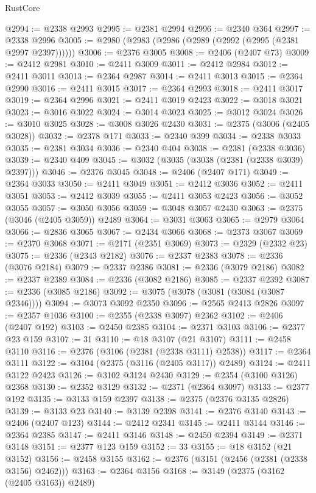 \begin{lexlean}{RustCore}
\begin{coremodule}
@2994 := @2338 @2993
@2995 := @2381 @2994
@2996 := @2340 @364
@2997 := @2338 @2996
@3005 := @2980 (@2983 (@2986 (@2989 (@2992 (@2995 (@2381 @2997 @2397))))))
@3006 := @2376 @3005
@3008 := @2406 (@2407 @73)
@3009 := @2412 @2981
@3010 := @2411 @3009
@3011 := @2412 @2984
@3012 := @2411 @3011
@3013 := @2364 @2987
@3014 := @2411 @3013
@3015 := @2364 @2990
@3016 := @2411 @3015
@3017 := @2364 @2993
@3018 := @2411 @3017
@3019 := @2364 @2996
@3021 := @2411 @3019 @2423
@3022 := @3018 @3021
@3023 := @3016 @3022
@3024 := @3014 @3023
@3025 := @3012 @3024
@3026 := @3010 @3025
@3028 := @3008 @3026 @2430
@3031 := @2375 (@3006 (@2405 @3028))
@3032 := @2378 @171
@3033 := @2340 @399
@3034 := @2338 @3033
@3035 := @2381 @3034
@3036 := @2340 @404
@3038 := @2381 (@2338 @3036)
@3039 := @2340 @409
@3045 := @3032 (@3035 (@3038 (@2381 (@2338 @3039) @2397)))
@3046 := @2376 @3045
@3048 := @2406 (@2407 @171)
@3049 := @2364 @3033
@3050 := @2411 @3049
@3051 := @2412 @3036
@3052 := @2411 @3051
@3053 := @2412 @3039
@3055 := @2411 @3053 @2423
@3056 := @3052 @3055
@3057 := @3050 @3056
@3059 := @3048 @3057 @2430
@3063 := @2375 (@3046 (@2405 @3059)) @2489
@3064 := @3031 @3063
@3065 := @2979 @3064
@3066 := @2836 @3065
@3067 := @2434 @3066
@3068 := @2373 @3067
@3069 := @2370 @3068
@3071 := @2171 (@2351 @3069)
@3073 := @2329 (@2332 @23)
@3075 := @2336 (@2343 @2182)
@3076 := @2337 @2383
@3078 := @2336 (@3076 @2184)
@3079 := @2337 @2386
@3081 := @2336 (@3079 @2186)
@3082 := @2337 @2389
@3084 := @2336 (@3082 @2186)
@3085 := @2337 @2392
@3087 := @2336 (@3085 @2186)
@3092 := @3075 (@3078 (@3081 (@3084 (@3087 @2346))))
@3094 := @3073 @3092 @2350
@3096 := @2565 @2413 @2826
@3097 := @2357 @1036
@3100 := @2355 (@2338 @3097) @2362
@3102 := @2406 (@2407 @192)
@3103 := @2450 @2385
@3104 := @2371 @3103
@3106 := @2377 @23 @159
@3107 := 31
@3110 := @18 @3107 (@21 @3107)
@3111 := @2458 @3110
@3116 := @2376 (@3106 (@2381 (@2338 @3111) @2538))
@3117 := @2364 @3111
@3122 := @3104 (@2375 (@3116 (@2405 @3117)) @2489)
@3124 := @2411 @3122 @2423
@3126 := @3102 @3124 @2430
@3129 := @2354 (@3100 @3126) @2368
@3130 := @2352 @3129
@3132 := @2371 (@2364 @3097)
@3133 := @2377 @192
@3135 := @3133 @159 @2397
@3138 := @2375 (@2376 @3135 @2826)
@3139 := @3133 @23
@3140 := @3139 @2398
@3141 := @2376 @3140
@3143 := @2406 (@2407 @123)
@3144 := @2412 @2341
@3145 := @2411 @3144
@3146 := @2364 @2385
@3147 := @2411 @3146
@3148 := @2450 @2394
@3149 := @2371 @3148
@3151 := @2377 @123 @159
@3152 := 33
@3155 := @18 @3152 (@21 @3152)
@3156 := @2458 @3155
@3162 := @2376 (@3151 (@2456 (@2381 (@2338 @3156) @2462)))
@3163 := @2364 @3156
@3168 := @3149 (@2375 (@3162 (@2405 @3163)) @2489)

\end{coremodule}
\end{lexlean}
